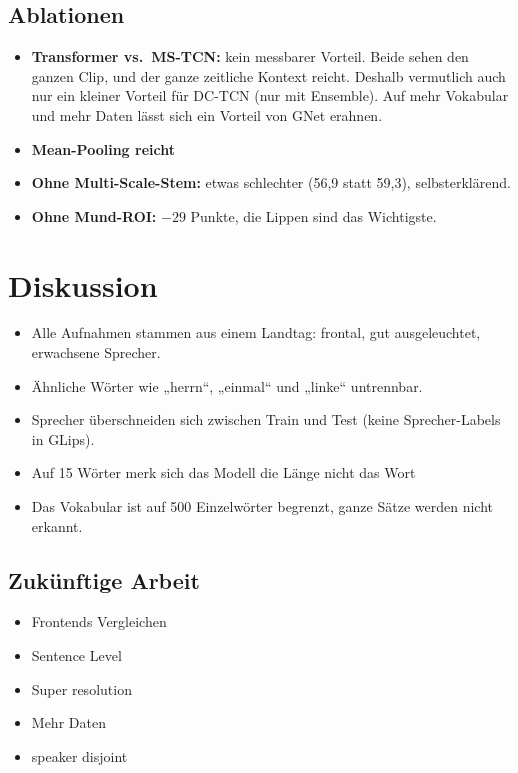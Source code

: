 \documentclass[11pt,a4paper]{article}
\begin{document}
\subsection{Ablationen}
\begin{itemize}
  \item \textbf{Transformer vs.\ MS-TCN:} kein messbarer Vorteil. Beide sehen den ganzen Clip, und der ganze zeitliche Kontext reicht. Deshalb vermutlich auch nur ein kleiner Vorteil für DC-TCN (nur mit Ensemble). Auf mehr Vokabular und mehr Daten lässt sich ein Vorteil von GNet erahnen.
  \item \textbf{Mean-Pooling reicht}
  \item \textbf{Ohne Multi-Scale-Stem:} etwas schlechter (56,9 statt 59,3), selbsterklärend.
  \item \textbf{Ohne Mund-ROI:} $-29$ Punkte, die Lippen sind das Wichtigste.
\end{itemize}

\newpage

\section{Diskussion}
\begin{itemize}
  \item Alle Aufnahmen stammen aus einem Landtag: frontal, gut ausgeleuchtet, erwachsene Sprecher.
  \item Ähnliche Wörter wie „herrn“, „einmal“ und „linke“ untrennbar.
  \item Sprecher überschneiden sich zwischen Train und Test (keine Sprecher-Labels in GLips).
  \item Auf 15 Wörter merk sich das Modell die Länge nicht das Wort
  \item Das Vokabular ist auf 500 Einzelwörter begrenzt, ganze Sätze werden nicht erkannt.

\end{itemize}
\subsection{Zukünftige Arbeit}
\begin{itemize}
  \item Frontends Vergleichen
  \item Sentence Level
  \item Super resolution
  \item Mehr Daten
  \item speaker disjoint
\end{itemize}
\end{document}
